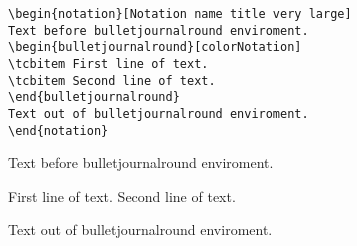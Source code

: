 \lipsum[1][1-3]
\begin{highlightbox}
\begin{verbatim}
\begin{notation}[Notation name title very large]
Text before bulletjournalround enviroment.
\begin{bulletjournalround}[colorNotation]
\tcbitem First line of text.
\tcbitem Second line of text.
\end{bulletjournalround}
Text out of bulletjournalround enviroment.
\end{notation}
\end{verbatim}
\end{highlightbox}
\begin{notation}
Text before bulletjournalround enviroment.
\begin{bulletjournalround}[colorNotation]
\tcbitem First line of text.
\tcbitem Second line of text.
\end{bulletjournalround}
Text out of bulletjournalround enviroment.
\end{notation}




